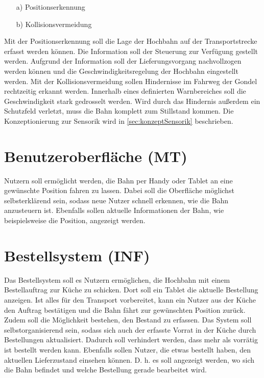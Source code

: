 \begin{itemize}
	\item [a)] Positionserkennung 
	\item [b)] Kollisionsvermeidung  
	
\end{itemize}

Mit der Positionserkennung soll die Lage der Hochbahn auf der Transportstrecke erfasst werden können. Die Information soll der Steuerung zur Verfügung gestellt werden. Aufgrund der Information soll der Lieferungsvorgang nachvollzogen werden können und die Geschwindigkeitsregelung der Hochbahn eingestellt werden. Mit der Kollisionsvermeidung sollen Hindernisse im Fahrweg der Gondel rechtzeitig erkannt werden. Innerhalb eines definierten Warnbereiches soll die Geschwindigkeit stark gedrosselt werden. Wird durch das Hindernis außerdem ein Schutzfeld verletzt, muss die Bahn komplett zum Stillstand kommen. Die Konzeptionierung zur Sensorik wird in \autoref{sec:konzeptSensorik} beschrieben.

\section{Benutzeroberfläche (MT)}
Nutzern soll ermöglicht werden, die Bahn per Handy oder Tablet an eine gewünschte Position fahren zu lassen. Dabei soll die Oberfläche möglichst selbsterklärend sein, sodass neue Nutzer schnell erkennen, wie die Bahn anzusteuern ist. Ebenfalls sollen aktuelle Informationen der Bahn, wie beispielsweise die Position, angezeigt werden.

\section{Bestellsystem (INF)}
\label{sec:anforderungBestellstystem}

Das Bestellsystem soll es Nutzern ermöglichen, die Hochbahn mit einem Bestellauftrag zur Küche zu schicken. 
Dort soll ein Tablet die aktuelle Bestellung anzeigen. Ist alles für den Transport vorbereitet, kann ein Nutzer aus der Küche den Auftrag 
bestätigen und die Bahn fährt zur gewünschten Position zurück. \\
Zudem soll die Möglichkeit bestehen, den Bestand zu erfassen. Das System soll selbstorganisierend sein, sodass sich auch der erfasste Vorrat in der Küche durch Bestellungen aktualisiert. Dadurch soll verhindert werden, dass mehr als vorrätig ist bestellt werden kann.
Ebenfalls sollen Nutzer, die etwas bestellt haben, den aktuellen Lieferzustand einsehen können. D. h. es soll angezeigt werden, wo sich die Bahn befindet und welche Bestellung gerade bearbeitet wird.

